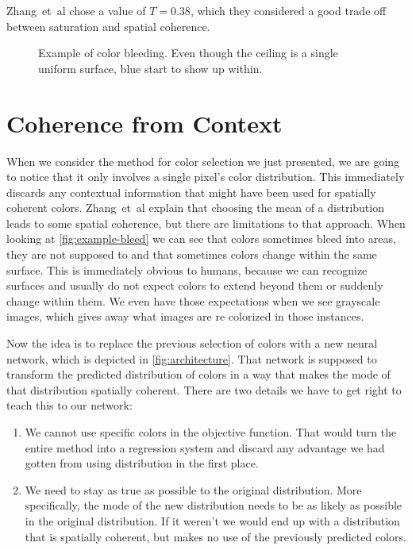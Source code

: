 \documentclass[11pt]{article}
\begin{document}
Zhang~et~al\cite{zhang2016colorful} chose a value of $T=0.38$, which they considered a good trade off between saturation and spatial coherence.

\begin{figure}
    
    \caption{
    Example of color bleeding. Even though the ceiling is a single uniform surface, blue start to show up within.
    }
    \label{fig:example-bleed}
\end{figure}

\section{Coherence from Context}

When we consider the method for color selection we just presented, we are going to notice that it only involves a single pixel's color distribution. This immediately discards any contextual information that might have been used for spatially coherent colors. Zhang~et~al\cite{zhang2016colorful} explain that choosing the mean of a distribution leads to some spatial coherence, but there are limitations to that approach. When looking at \autoref{fig:example-bleed} we can see that colors sometimes bleed into areas, they are not supposed to and that sometimes colors change within the same surface. This is immediately obvious to humans, because we can recognize surfaces and usually do not expect colors to extend beyond them or suddenly change within them. We even have those expectations when we see grayscale images, which gives away what images are re colorized in those instances.

Now the idea is to replace the previous selection of colors with a new neural network, which is depicted in \autoref{fig:architecture}. That network is supposed to transform the predicted distribution of colors in a way that makes the mode of that distribution spatially coherent. There are two details we have to get right to teach this to our network:

\begin{enumerate}
    \item We cannot use specific colors in the objective function. That would turn the entire method into a regression system and discard any advantage we had gotten from using distribution in the first place.
    \item We need to stay as true as possible to the original distribution. More specifically, the mode of the new distribution needs to be as likely as possible in the original distribution. If it weren't we would end up with a distribution that is spatially coherent, but makes no use of the previously predicted colors.
\end{enumerate}
\end{document}
